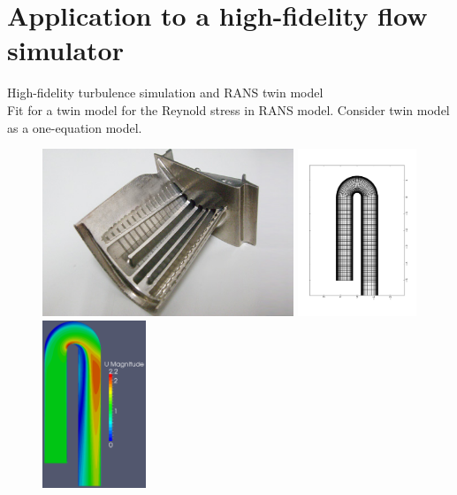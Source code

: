 \documentclass[a4paper,onecolumn]{article}
\theoremstyle{remark}
\begin{document}
\section{Application to a high-fidelity flow simulator}
\label{examples}
High-fidelity turbulence simulation and RANS twin model\\
Fit for a twin model for the Reynold stress in RANS model.
Consider twin model as a one-equation model.
\begin{figure}[H]
    \includegraphics[height=5cm]{ubend.png}
    \includegraphics[height=5cm]{overall_mesh.png}
    \includegraphics[height=5cm]{OpenFOAM_mesh.png}
\end{figure}
\end{document}
